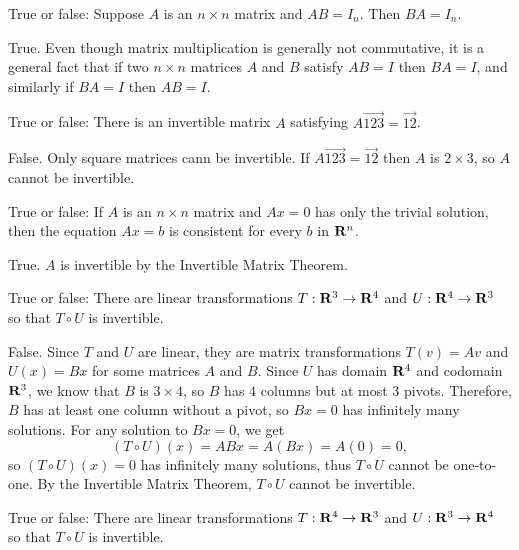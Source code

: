 \begin{problems}
%  
\problem %
True or false: Suppose $A$ is an $n \times n$ matrix and $AB = I_n$. 
Then $BA = I_n$.  \newline %
\begin{solution}
 True.  Even though matrix multiplication is generally
    not commutative, it is a general fact that if two $n \times n$
    matrices $A$ and $B$ satisfy $AB=I$ then $BA=I$, and similarly if
    $BA=I$ then $AB=I$. %
\end{solution}

\problem %
True or false: There is an invertible matrix $A$ satisfying 
$A \vec{1 2 3} = \vec{1 2}$. 

\begin{solution}
False.  Only square matrices cann be invertible.  If
    $A \vec{1 2 3} = \vec{1 2}$ then $A$ is $2 \times 3$, so $A$
    cannot be invertible. %
\end{solution}

\problem True or false: If $A$ is an $n \times n$ matrix and $Ax=0$ has 
only the trivial solution, then the equation $Ax=b$ is consistent for 
every $b$ in ${\bf R}^n$. 

\begin{solution}
  True.  $A$ is invertible by the Invertible Matrix Theorem.   
\end{solution}

\problem True or false: There are linear transformations $T: {\bf R}^3 
\to {\bf R}^4$ and $U: {\bf R}^4 \to {\bf R}^3$ so that $T \circ U$ is 
invertible.

\begin{solution}
False.  Since $T$ and $U$ are linear, they are matrix transformations $T(v) = Av$ and $U(x) = Bx$ for some matrices $A$ and $B$.  Since $U$ has domain ${\bf R}^4$ and codomain ${\bf R}^3$, we know that $B$ is $3 \times 4$, so $B$ has $4$ columns but at most $3$ pivots.  Therefore, $B$ has at least one column without a pivot, so $Bx = 0$ has infinitely many solutions.  For any solution to $Bx=0$, we get
\[(T \circ U)(x) = ABx = A(Bx)=A(0) = 0,\]
so $(T \circ U)(x)=0$ has infinitely many solutions, thus $T \circ U$ cannot be one-to-one.  By the Invertible Matrix Theorem, $T \circ U$ cannot be invertible.
\end{solution}

\problem True or false: There are linear transformations $T: {\bf R}^4 
\to {\bf R}^3$ and $U: {\bf R}^3 \to {\bf R}^4$ so that $T \circ U$ is 
invertible.


\end{problems}
